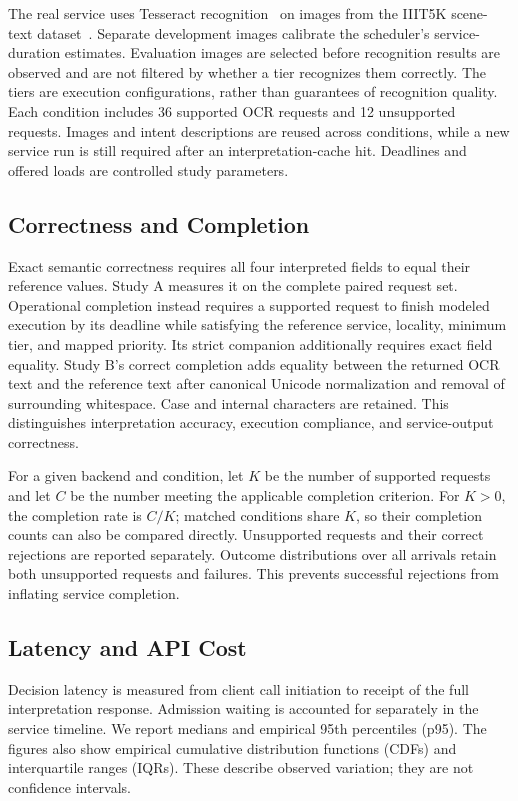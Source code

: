 The real service uses Tesseract recognition~\cite{smith2007overview} on images
from the IIIT5K scene-text dataset~\cite{mishra2012scene}. Separate development
images calibrate the scheduler's service-duration estimates. Evaluation
images are selected before recognition results are observed and are not
filtered by whether a tier recognizes them correctly. The tiers are execution
configurations, rather than guarantees of recognition quality. Each condition
includes 36 supported OCR requests and 12 unsupported requests. Images and
intent descriptions are reused across conditions, while a new service run
is still required after an interpretation-cache hit. Deadlines and offered
loads are controlled study parameters.

\subsection{Correctness and Completion}
\label{sec:metrics}
Exact semantic correctness requires all four interpreted fields to equal
their reference values. Study A measures it on the complete paired request
set. Operational completion instead requires a supported request to finish
modeled execution by its deadline while satisfying the reference service,
locality, minimum tier, and mapped priority. Its strict companion additionally
requires exact field equality. Study B's correct completion adds equality
between the returned OCR text and the reference text after canonical Unicode
normalization and removal of surrounding whitespace. Case and internal
characters are retained. This distinguishes interpretation
accuracy, execution compliance, and service-output correctness.

For a given backend and condition, let $K$ be the number of supported
requests and let $C$ be the number meeting the applicable completion
criterion. For $K>0$, the completion rate is $C/K$; matched conditions share $K$, so
their completion counts can also be compared directly. Unsupported requests
and their correct rejections are reported separately. Outcome distributions
over all arrivals retain both unsupported requests and failures. This
prevents successful rejections from inflating service completion.

\subsection{Latency and API Cost}
Decision latency is measured from client call initiation to receipt of the
full interpretation response. Admission waiting is accounted for separately
in the service timeline. We report medians and empirical 95th percentiles
(p95). The figures also show empirical cumulative distribution functions
(CDFs) and interquartile ranges (IQRs). These describe observed variation;
they are not confidence intervals.

